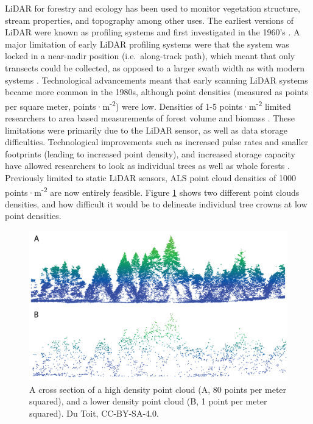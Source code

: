 \documentclass[
]{book}
\begin{document}
LiDAR for forestry and ecology has been used to monitor vegetation structure, stream properties, and topography among other uses. The earliest versions of LiDAR were known as profiling systems and first investigated in the 1960's \citep{nelson_how_2013}. A major limitation of early LiDAR profiling systems were that the system was locked in a near-nadir position (i.e.~along-track path), which meant that only transects could be collected, as opposed to a larger swath width as with modern systems \citep{nelson_how_2013, lim_lidar_2003}. Technological advancements meant that early scanning LiDAR systems became more common in the 1980s, although point densities (measured as points per square meter, points·m\textsuperscript{-2}) were low. Densities of 1-5 points·m\textsuperscript{-2} limited researchers to area based measurements of forest volume and biomass \citep{nelson_how_2013}. These limitations were primarily due to the LiDAR sensor, as well as data storage difficulties. Technological improvements such as increased pulse rates and smaller footprints (leading to increased point density), and increased storage capacity have allowed researchers to look as individual trees as well as whole forests \citep{jakubowski_delineating_2013}. Previously limited to static LiDAR sensors, ALS point cloud densities of 1000 points·m\textsuperscript{-2} are now entirely feasible. Figure \ref{fig:15-high-low-point-density} shows two different point clouds densities, and how difficult it would be to delineate individual tree crowns at low point densities.

\begin{figure}
\includegraphics[width=0.8\linewidth]{images/15-high-low-point-density} \caption{A cross section of a high density point cloud (A, 80 points per meter squared), and a lower density point cloud (B, 1 point per meter squared). Du Toit, CC-BY-SA-4.0.}\label{fig:15-high-low-point-density}
\end{figure}
\end{document}
